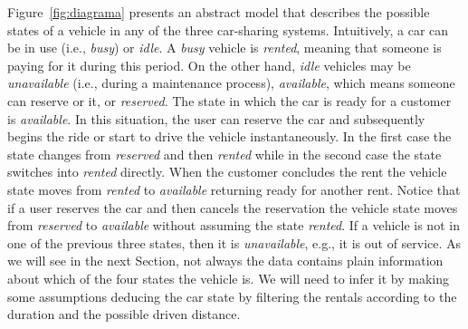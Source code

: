 Figure~\ref{fig:diagrama} presents an abstract model that describes the possible states of a vehicle in any of the three car-sharing systems.
Intuitively, a car can be in use (i.e., \textit{busy}) or \textit{idle}. A \textit{busy} vehicle is \textit{rented}, meaning that someone is paying for it during this period. On the other hand, \textit{idle} vehicles may be \textit{unavailable} (i.e., during a maintenance process), \textit{available}, which means someone can reserve or it, or \textit{reserved}. 
The state in which the car is ready for a customer is \textit{available}. In this situation, the user can reserve the car and subsequently begins the ride or start to drive the vehicle instantaneously. In the first case the state changes from \textit{reserved} and then \textit{rented} while in the second case the state switches into \textit{rented} directly. When the customer concludes the rent the vehicle state moves from \textit{rented} to \textit{available} returning ready for another rent. Notice that if a user reserves the car and then cancels the reservation the vehicle state moves from \textit{reserved} to \textit{available} without assuming the state \textit{rented}. If a vehicle is not in one of the previous three states, then it is \textit{unavailable}, e.g., it is out of service. As we will see in the next Section, not always the data contains plain information about which of the four states the vehicle is. We will need to infer it by making some assumptions deducing the car state by filtering the rentals according to the duration and the possible driven distance.

